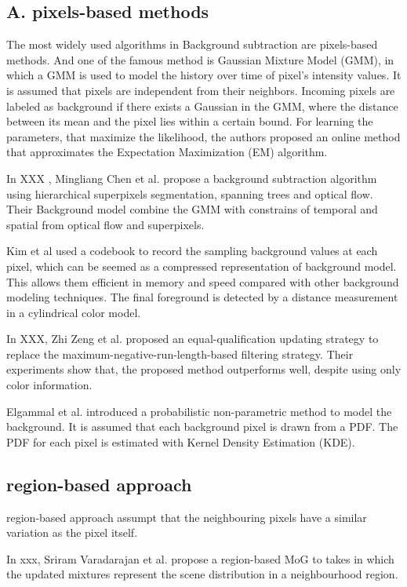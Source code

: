\documentclass[journal]{IEEEtran}
\begin{document}
\subsection{A. pixels-based methods}
\label{sec_spa}
The most widely used algorithms in Background subtraction are pixels-based methods.
And one of the famous method is Gaussian Mixture Model (GMM), in which a GMM is used to model the history over time of pixel’s intensity values.
It is assumed that pixels are independent from their neighbors.
Incoming pixels are labeled as background if there exists a Gaussian in the GMM, where the distance between its mean and the pixel lies within a certain bound.
For learning the parameters, that maximize the likelihood, the authors proposed an online method that approximates the Expectation Maximization (EM) algorithm.

In XXX , Mingliang Chen et al.
propose a background subtraction algorithm using hierarchical superpixels segmentation, spanning trees and optical flow.
Their Background model combine the GMM with constrains of temporal and spatial from optical flow and superpixels.

Kim et al used a codebook to record the sampling background values at each pixel, which can be seemed as a compressed representation of background model.
This allows them efficient in memory and speed compared with other background modeling techniques.
The final foreground is detected by a distance measurement in a cylindrical color model.

In XXX, Zhi Zeng et al.
proposed an equal-qualification updating strategy to replace the maximum-negative-run-length-based filtering strategy.
Their experiments show that, the proposed method outperforms well, despite using only color information.

Elgammal et al.
introduced a probabilistic non-parametric method to model the background.
It is assumed that each background pixel is drawn from a PDF.
The PDF for each pixel is estimated with Kernel Density Estimation (KDE).



\subsection{region-based approach}
\label{sec_geo}
region-based approach assumpt that the neighbouring pixels have a similar variation as the pixel itself.

In xxx, Sriram Varadarajan et al.
propose a region-based MoG to takes in which the updated mixtures represent the scene distribution in a neighbourhood region.
\end{document}
